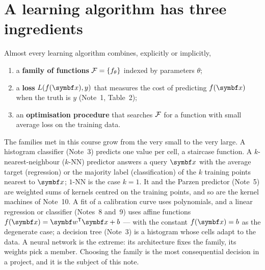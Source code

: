 \documentclass[11pt]{article}
\begin{document}

\section{A learning algorithm has three ingredients}\label{sec:ingredients}

Almost every learning algorithm combines, explicitly or implicitly,
\begin{enumerate}
\item a \textbf{family of functions} $\mathcal{F} = \{f_\theta\}$ indexed by parameters $\theta$;
\item a \textbf{loss} $L(f(\x), y)$ that measures the cost of predicting $f(\x)$ when the truth is $y$
(Note~1, Table~2);
\item an \textbf{optimisation procedure} that searches $\mathcal{F}$ for a function with small average loss on the training
data.
\end{enumerate}
The families met in this course grow from the very small to the very large. A histogram classifier (Note~3)
predicts one value per cell, a staircase function. A $k$-nearest-neighbour ($k$-NN) predictor answers a query $\x$
with the average target (regression) or the majority label (classification) of the $k$ training points nearest to
$\x$; $1$-NN is the case $k = 1$. It and the Parzen predictor (Note~5) are weighted sums of kernels centred on the
training points, and so are the kernel machines of Note~10. A fit of a calibration curve uses polynomials, and a linear regression or
classifier (Notes~8 and~9) uses affine functions $f(\x) = \vect{w}\T\x + b$ --- with the constant $f(\x) = b$ as the
degenerate case; a decision tree (Note~3) is a histogram whose cells adapt to the data. A neural network is the extreme: its architecture fixes the family, its weights pick a member.
Choosing the family is the most consequential decision in a project, and it is the subject of this note.
\end{document}
